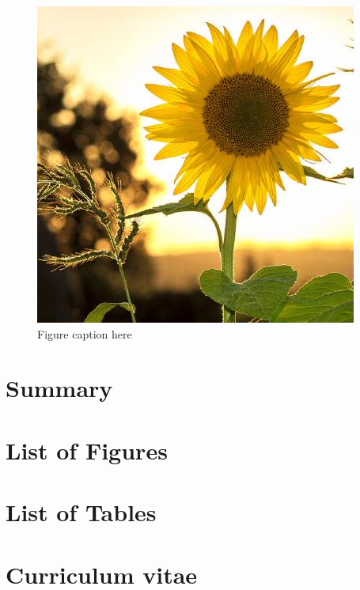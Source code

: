 \documentclass[a4paper,12pt,UTF8,openright]{book}
\begin{document}
\begin{figure}
	\centering
	\includegraphics[width=\textwidth]{29571453.jpg}
	\caption{Figure caption here}
	\label{fig:29571453.jpg}
\end{figure}


\chapter{Summary}
\lipsum[1-5]

{}


\chapter*{List of Figures}

\chapter*{List of Tables}

\chapter*{Curriculum vitae}
\end{document}
